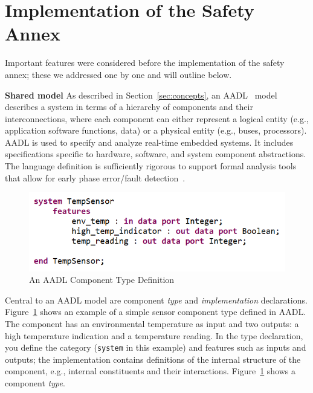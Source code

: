 \section{Implementation of the Safety Annex}
\label{sec:impl}
Important features were considered before the implementation of the safety annex; these we addressed one by one and will outline below. 

\textbf{Shared model} As described in Section~\ref{sec:concepts}, an AADL~\cite{AADL_Standard} model describes a system in terms of a hierarchy of components and their interconnections, where each component can either represent a logical entity (e.g., application software functions, data) or a physical entity (e.g., buses, processors). AADL is used to specify and analyze real-time embedded systems. It includes specifications specific to hardware, software, and system component abstractions. The language definition is sufficiently rigorous to support formal analysis tools that allow for early phase error/fault detection~\cite{FeilerModelBasedEngineering2012}. 

\begin{figure}[h!]
	\begin{center}
	\includegraphics[width=.8\textwidth]{images/aadlComponent.png}
	\caption{An AADL Component Type Definition}
	\label{fig:aadlComponent}
	\end{center}
\end{figure}

Central to an AADL model are component \emph{type} and \emph{implementation} declarations. Figure~\ref{fig:aadlComponent} shows an example of a simple sensor component type defined in AADL. The component has an environmental temperature as input and two outputs: a high temperature indication and a temperature reading. In the type declaration, you define the category (\texttt{system} in this example) and features such as inputs and outputs; the implementation contains definitions of the internal structure of the component, e.g., internal constituents and their interactions. Figure~\ref{fig:aadlComponent} shows a component {\em type}. 

